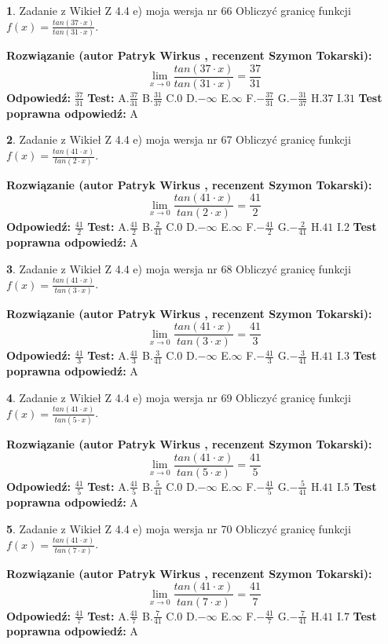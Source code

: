 \documentclass[12pt, a4paper]{article}
\theoremstyle{definition} %
\newtheorem{zad}{}
\newcommand{\zadStart}[1]{\begin{zad}#1\newline}
\newcommand{\zadStop}{\end{zad}}
\newcommand{\rozwStart}[2]{\noindent \textbf{Rozwiązanie (autor #1 , recenzent #2): }\newline}
\newcommand{\rozwStop}{\newline}
\newcommand{\odpStart}{\noindent \textbf{Odpowiedź:}\newline}
\newcommand{\odpStop}{\newline}
\newcommand{\testStart}{\noindent \textbf{Test:}\newline}
\newcommand{\testStop}{\newline}
\newcommand{\kluczStart}{\noindent \textbf{Test poprawna odpowiedź:}\newline}
\newcommand{\kluczStop}{\newline}
\begin{document}
\zadStart{Zadanie z Wikieł Z 4.4 e) moja wersja nr 66}
Obliczyć granicę funkcji $f(x)=\frac{tan(37\cdot x)}{tan(31\cdot x)}$.
\zadStop
\rozwStart{Patryk Wirkus}{Szymon Tokarski}
$$\lim\limits_{x\to 0}\frac{tan(37\cdot x)}{tan(31\cdot x)}=
\frac{37}{31}$$
\rozwStop
\odpStart
$\frac{37}{31}$
\odpStop
\testStart
A.$\frac{37}{31}$
B.$\frac{31}{37}$
C.$0$
D.$-\infty$
E.$\infty$
F.$-\frac{37}{31}$
G.$-\frac{31}{37}$
H.$37$
I.$31$
\testStop
\kluczStart
A
\kluczStop



\zadStart{Zadanie z Wikieł Z 4.4 e) moja wersja nr 67}
Obliczyć granicę funkcji $f(x)=\frac{tan(41\cdot x)}{tan(2\cdot x)}$.
\zadStop
\rozwStart{Patryk Wirkus}{Szymon Tokarski}
$$\lim\limits_{x\to 0}\frac{tan(41\cdot x)}{tan(2\cdot x)}=
\frac{41}{2}$$
\rozwStop
\odpStart
$\frac{41}{2}$
\odpStop
\testStart
A.$\frac{41}{2}$
B.$\frac{2}{41}$
C.$0$
D.$-\infty$
E.$\infty$
F.$-\frac{41}{2}$
G.$-\frac{2}{41}$
H.$41$
I.$2$
\testStop
\kluczStart
A
\kluczStop



\zadStart{Zadanie z Wikieł Z 4.4 e) moja wersja nr 68}
Obliczyć granicę funkcji $f(x)=\frac{tan(41\cdot x)}{tan(3\cdot x)}$.
\zadStop
\rozwStart{Patryk Wirkus}{Szymon Tokarski}
$$\lim\limits_{x\to 0}\frac{tan(41\cdot x)}{tan(3\cdot x)}=
\frac{41}{3}$$
\rozwStop
\odpStart
$\frac{41}{3}$
\odpStop
\testStart
A.$\frac{41}{3}$
B.$\frac{3}{41}$
C.$0$
D.$-\infty$
E.$\infty$
F.$-\frac{41}{3}$
G.$-\frac{3}{41}$
H.$41$
I.$3$
\testStop
\kluczStart
A
\kluczStop



\zadStart{Zadanie z Wikieł Z 4.4 e) moja wersja nr 69}
Obliczyć granicę funkcji $f(x)=\frac{tan(41\cdot x)}{tan(5\cdot x)}$.
\zadStop
\rozwStart{Patryk Wirkus}{Szymon Tokarski}
$$\lim\limits_{x\to 0}\frac{tan(41\cdot x)}{tan(5\cdot x)}=
\frac{41}{5}$$
\rozwStop
\odpStart
$\frac{41}{5}$
\odpStop
\testStart
A.$\frac{41}{5}$
B.$\frac{5}{41}$
C.$0$
D.$-\infty$
E.$\infty$
F.$-\frac{41}{5}$
G.$-\frac{5}{41}$
H.$41$
I.$5$
\testStop
\kluczStart
A
\kluczStop



\zadStart{Zadanie z Wikieł Z 4.4 e) moja wersja nr 70}
Obliczyć granicę funkcji $f(x)=\frac{tan(41\cdot x)}{tan(7\cdot x)}$.
\zadStop
\rozwStart{Patryk Wirkus}{Szymon Tokarski}
$$\lim\limits_{x\to 0}\frac{tan(41\cdot x)}{tan(7\cdot x)}=
\frac{41}{7}$$
\rozwStop
\odpStart
$\frac{41}{7}$
\odpStop
\testStart
A.$\frac{41}{7}$
B.$\frac{7}{41}$
C.$0$
D.$-\infty$
E.$\infty$
F.$-\frac{41}{7}$
G.$-\frac{7}{41}$
H.$41$
I.$7$
\testStop
\kluczStart
A
\kluczStop
\end{document}
